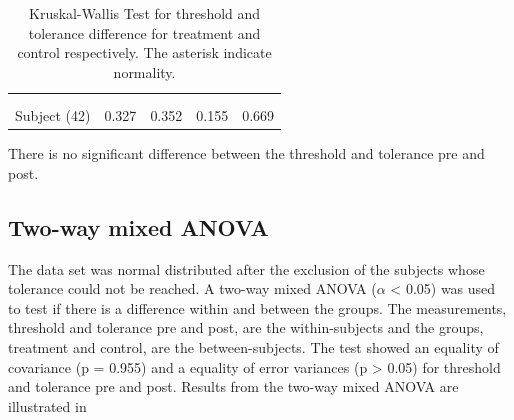 \begin{longtable} {l|c|c|c|c}
	\caption{Kruskal-Wallis Test for threshold and tolerance difference for treatment and control respectively. The asterisk indicate normality.}
	\label{tab:KruskalWallis1} \\ 
	 \cellcolor[HTML]{C0C0C0} {} &
\multicolumn{2}{c|}{ \cellcolor[HTML]{C0C0C0}{\textbf{Threshold}}} & \multicolumn{2}{c}{ \cellcolor[HTML]{C0C0C0}{\textbf{Tolerance}}}  	\\  \rule{0pt}{3ex} 
  \cellcolor[HTML]{C0C0C0}{} &
 \multicolumn{1}{c|}{ \cellcolor[HTML]{C0C0C0}{Pre }} & \multicolumn{1}{c|}{ \cellcolor[HTML]{C0C0C0}{Post}} 
 & \multicolumn{1}{|c|}{ \cellcolor[HTML]{C0C0C0}{Pre}} 
 & \multicolumn{1}{c}{ \cellcolor[HTML]{C0C0C0}{Post}} 	\\ \hline
Subject (42) & 0.327  & 0.352 & 0.155  & 0.669 \\ \hline
\end{longtable}
\vspace{-.5cm}

There is no significant difference between the threshold and tolerance pre and post.

\subsection{Two-way mixed ANOVA}
The data set was normal distributed after the exclusion of the subjects whose tolerance could not be reached.
A two-way mixed ANOVA ($\alpha$ < 0.05) was used to test  if there is a difference within and between the groups.
The measurements, threshold and tolerance pre and post, are the within-subjects and the groups, treatment and control, are the between-subjects. The test showed an equality of covariance (p = 0.955) and a equality of error variances (p > 0.05) for threshold and tolerance pre and post. Results from the two-way mixed ANOVA are illustrated in 

